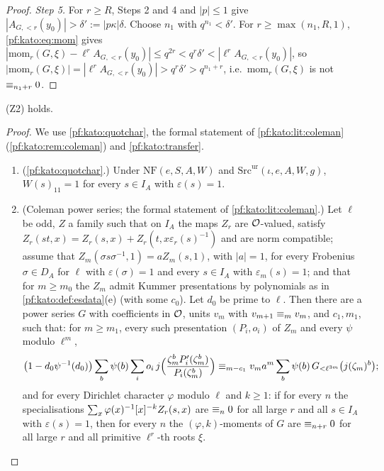 \begin{proof}
\emph{Step 5.} For $r\ge R$, Steps 2 and 4 and $|p|\le1$ give $|A_{G,<r}(y_0)|>\delta':=|p\kappa|\delta$. Choose $n_1$ with $q^{n_1}<\delta'$.
For $r\ge\max(n_1,R,1)$, \eqref{pf:kato:eq:mom} gives $|\mathrm{mom}_r(G,\xi)-\ell^rA_{G,<r}(y_0)|\le q^{2r}<q^r\delta'<|\ell^rA_{G,<r}(y_0)|$, so
$|\mathrm{mom}_r(G,\xi)|=|\ell^rA_{G,<r}(y_0)|>q^{r}\delta'>q^{n_1+r}$, i.e.\ $\mathrm{mom}_r(G,\xi)$ is not $\equiv_{n_1+r}0$.
\end{proof}

\begin{theorem}\label{pf:kato:plocu}
\textup{(Z2)} holds.
\end{theorem}

\begin{proof}
We use \cref{pf:kato:quotchar}, the formal statement of \cref{pf:kato:lit:coleman} (\cref{pf:kato:rem:coleman}) and
\cref{pf:kato:transfer}.
\begin{enumerate}[label=(\roman*)]
\item (\cref{pf:kato:quotchar}.) Under $\mathrm{NF}(e,S,A,W)$ and $\mathrm{Src}^{\mathrm{ur}}(\iota,e,A,W,g)$, $W(s)_{11}=1$ for every
  $s\in I_A$ with $\varepsilon(s)=1$.
\item (Coleman power series; the formal statement of \cref{pf:kato:lit:coleman}.) Let $\ell$ be odd, $Z$ a family such that on $I_A$ the
  maps $Z_r$ are $\mathcal{O}$-valued, satisfy $Z_r(st,x)=Z_r(s,x)+Z_r(t,x\varepsilon_r(s)^{-1})$ and are norm compatible; assume that
  $Z_m(\sigma s\sigma^{-1},1)=aZ_m(s,1)$, with $|a|=1$, for every Frobenius $\sigma\in D_A$ for $\ell$ with $\varepsilon(\sigma)=1$ and
  every $s\in I_A$ with $\varepsilon_m(s)=1$; and that for $m\ge m_0$ the $Z_m$ admit Kummer presentations by polynomials as in
  \cref{pf:kato:def:esdata}(e) (with some $c_0$). Let $d_0$ be prime to $\ell$. Then there are a power series $G$ with
  coefficients in $\mathcal{O}$, units $v_m$ with $v_{m+1}\equiv_{m}v_m$, and $c_1,m_1$, such that: for $m\ge m_1$, every such
  presentation $(P_i,o_i)$ of $Z_m$ and every $\psi$ modulo $\ell^m$,
  \[
    \bigl(1-d_0\psi^{-1}(d_0)\bigr)\sum_b\psi(b)\sum_io_i\,j\Bigl(\frac{\zeta_m^bP_i'(\zeta_m^b)}{P_i(\zeta_m^b)}\Bigr)
    \equiv_{m-c_1}v_ma^m\sum_b\psi(b)\,G_{<\ell^{3m}}\bigl(j(\zeta_m)^b\bigr);
  \]
  and for every Dirichlet character $\varphi$ modulo $\ell$ and $k\ge1$: if for every $n$ the specialisations
  $\sum_x\varphi(x)^{-1}[x]^{-k}Z_r(s,x)$ are $\equiv_{n}0$ for all large $r$ and all $s\in I_A$ with $\varepsilon(s)=1$, then for
  every $n$ the $(\varphi,k)$-moments of $G$ are $\equiv_{n+r}0$ for all large $r$ and all primitive $\ell^r$-th roots $\xi$.

\end{enumerate}
\end{proof}
